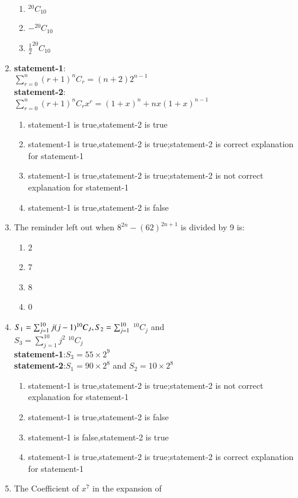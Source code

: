 \begin{enumerate}[label=\arabic*.,ref=\thesubsection.\theenumi]
\begin{enumerate}
    \item $^{20}C_{10}$
    \item $-^{20}C_{10}$
    \item $\frac{1}{2}^{20}C_{10}$
\end{enumerate}
\item \textbf{statement-1}:\\$\sum_{r=0}^{n}(r+1) ^nC_r=(n+2)2^{n-1}$\\
\textbf{statement-2}:\\$\sum_{r=0}^{n}(r+1) ^nC_r x^r=(1+x)^n+nx(1+x)^{n-1}$
\begin{enumerate}
    \item statement-1 is true,statement-2 is true
    \item statement-1 is true,statement-2 is true;statement-2 is correct explanation for statement-1
    \item statement-1 is true,statement-2 is true;statement-2 is not correct explanation for statement-1
    \item statement-1 is true,statement-2 is false
\end{enumerate}
\item The reminder left out when $8^{2n}-(62)^{2n+1}$ is divided by 9 is:
\begin{enumerate}
    \item 2
    \item 7
    \item 8
    \item 0
\end{enumerate}
\item $S_1=\sum_{j=1}^{10} j(j-1) ^{10}C_J,\\
S_2=\sum_{j=1} ^{10}$ $^{10}C_j$ and \\
$S_3=\sum_{j=1}^{10} j^2$ $^{10}C_j$\\
\textbf{statement-1}:$S_3=55\times2^9$\\
\textbf{statement-2}:$S_1=90\times2^8$ and $S_2=10\times2^8$
\begin{enumerate}
    \item statement-1 is true,statement-2 is true;statement-2 is not correct explanation for statement-1
    \item statement-1 is true,statement-2 is false
    \item statement-1 is false,statement-2 is true
    \item statement-1 is true,statement-2 is true;statement-2 is  correct explanation for statement-1
\end{enumerate}
\item The Coefficient of $x^7$ in the expansion of\\

\end{enumerate}
